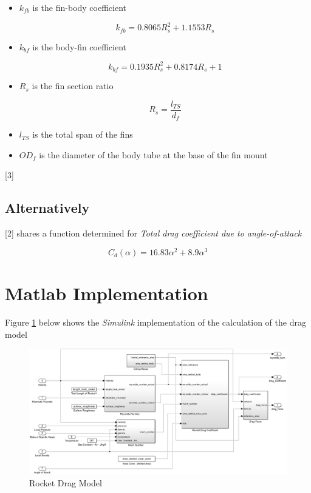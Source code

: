 \documentclass[]{book}
\providecommand{\tightlist}{%
  \setlength{\itemsep}{0pt}\setlength{\parskip}{0pt}}
\begin{document}
\begin{itemize}
\tightlist
\item
  \(k_{fb}\) is the fin-body coefficient

  \begin{equation}
  \label{eq_fin_body_coef_aoa}
  k_{fb} = 0.8065 R^2_s + 1.1553 R_s
  \end{equation}
\item
  \(k_{bf}\) is the body-fin coefficient

  \begin{equation}
  \label{eq_body_fin_coef_aoa}
  k_{bf} = 0.1935 R^2_s + 0.8174 R_s + 1
  \end{equation}
\item
  \(R_s\) is the fin section ratio

  \begin{equation}
  \label{eq_fin_section_ratio}
  R_s = \dfrac{l_{TS}}{d_f}
  \end{equation}
\item
  \(l_{TS}\) is the total span of the fins
\item
  \(OD_f\) is the diameter of the body tube at the base of the fin mount
\end{itemize}

{[}3{]}

\subsection{Alternatively}\label{alternatively}

{[}2{]} shares a function determined for \emph{Total drag coefficient
due to angle-of-attack}

\begin{equation}
\label{eq_darg_total_aoa}
C_d (\alpha) = 16.83 \alpha^2 + 8.9 \alpha^3
\end{equation}

\section{Matlab Implementation}\label{matlab-implementation}

Figure \ref{rocket_drag_model_label} below shows the \emph{Simulink}
implementation of the calculation of the drag model

\begin{figure}[htbp]
\centering
\includegraphics{images/rocket_drag_model.png}
\caption{Rocket Drag Model\label{rocket_drag_model_label}}
\end{figure}
\end{document}

